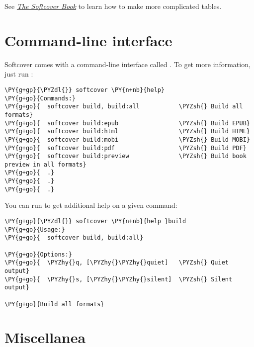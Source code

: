 See \href{http://manual.softcover.io/book/softcover_markdown#sec-embedded_tabular_and_tables}{\emph{The Softcover Book}} to learn how to make more complicated tables.

\section{Command-line interface}

Softcover comes with a command-line interface called . To get more information, just run :

\begin{framed_shaded}
\begin{Verbatim}[fontsize=\relsize{-2.5},fontseries=b,commandchars=\\\{\}]
\PY{g+gp}{\PYZdl{}} softcover \PY{n+nb}{help}
\PY{g+go}{Commands:}
\PY{g+go}{  softcover build, build:all           \PYZsh{} Build all formats}
\PY{g+go}{  softcover build:epub                 \PYZsh{} Build EPUB}
\PY{g+go}{  softcover build:html                 \PYZsh{} Build HTML}
\PY{g+go}{  softcover build:mobi                 \PYZsh{} Build MOBI}
\PY{g+go}{  softcover build:pdf                  \PYZsh{} Build PDF}
\PY{g+go}{  softcover build:preview              \PYZsh{} Build book preview in all formats}
\PY{g+go}{  .}
\PY{g+go}{  .}
\PY{g+go}{  .}
\end{Verbatim}
\end{framed_shaded}

\noindent You can run  to get additional help on a given command:

\begin{framed_shaded}
\begin{Verbatim}[fontsize=\relsize{-2.5},fontseries=b,commandchars=\\\{\}]
\PY{g+gp}{\PYZdl{}} softcover \PY{n+nb}{help }build
\PY{g+go}{Usage:}
\PY{g+go}{  softcover build, build:all}

\PY{g+go}{Options:}
\PY{g+go}{  \PYZhy{}q, [\PYZhy{}\PYZhy{}quiet]   \PYZsh{} Quiet output}
\PY{g+go}{  \PYZhy{}s, [\PYZhy{}\PYZhy{}silent]  \PYZsh{} Silent output}

\PY{g+go}{Build all formats}
\end{Verbatim}
\end{framed_shaded}

\section{Miscellanea}

